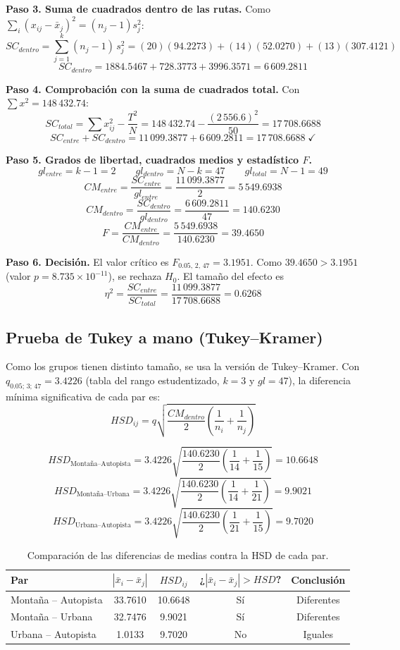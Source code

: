 \documentclass[12pt,letterpaper]{article}
\newcommand{\paren}[1]{\left(#1\right)}
\begin{document}
\textbf{Paso 3. Suma de cuadrados dentro de las rutas.} Como $\sum_i (x_{ij} - \bar{x}_j)^2 = (n_j - 1)s_j^2$:
$$ SC_{dentro} = \sum_{j=1}^{k} (n_j - 1)\,s_j^2 = (20)(94.2273) + (14)(52.0270) + (13)(307.4121) $$
$$ SC_{dentro} = 1884.5467 + 728.3773 + 3996.3571 = 6\,609.2811 $$

\textbf{Paso 4. Comprobación con la suma de cuadrados total.} Con $\sum x^2 = 148\,432.74$:
$$ SC_{total} = \sum x_{ij}^2 - \frac{T^2}{N} = 148\,432.74 - \frac{(2\,556.6)^2}{50} = 17\,708.6688 $$
$$ SC_{entre} + SC_{dentro} = 11\,099.3877 + 6\,609.2811 = 17\,708.6688 \;\checkmark $$

\textbf{Paso 5. Grados de libertad, cuadrados medios y estadístico $F$.}
$$ gl_{entre} = k - 1 = 2 \qquad gl_{dentro} = N - k = 47 \qquad gl_{total} = N - 1 = 49 $$
$$ CM_{entre} = \frac{SC_{entre}}{gl_{entre}} = \frac{11\,099.3877}{2} = 5\,549.6938 $$
$$ CM_{dentro} = \frac{SC_{dentro}}{gl_{dentro}} = \frac{6\,609.2811}{47} = 140.6230 $$
$$ F = \frac{CM_{entre}}{CM_{dentro}} = \frac{5\,549.6938}{140.6230} = 39.4650 $$

\textbf{Paso 6. Decisión.} El valor crítico es $F_{0.05,\,2,\,47} = 3.1951$. Como $39.4650 > 3.1951$ (valor $p = 8.735 \times 10^{-11}$), se rechaza $H_0$. El tamaño del efecto es
$$ \eta^2 = \frac{SC_{entre}}{SC_{total}} = \frac{11\,099.3877}{17\,708.6688} = 0.6268 $$


\subsection{Prueba de Tukey a mano (Tukey--Kramer)}

Como los grupos tienen distinto tamaño, se usa la versión de Tukey--Kramer. Con $q_{0.05;\,3;\,47} = 3.4226$ (tabla del rango estudentizado, $k = 3$ y $gl = 47$), la diferencia mínima significativa de cada par es:
$$ HSD_{ij} = q \sqrt{\frac{CM_{dentro}}{2}\paren{\frac{1}{n_i} + \frac{1}{n_j}}} $$

$$ HSD_{\text{Montaña--Autopista}} = 3.4226\sqrt{\frac{140.6230}{2}\paren{\frac{1}{14} + \frac{1}{15}}} = 10.6648 $$
$$ HSD_{\text{Montaña--Urbana}} = 3.4226\sqrt{\frac{140.6230}{2}\paren{\frac{1}{14} + \frac{1}{21}}} = 9.9021 $$
$$ HSD_{\text{Urbana--Autopista}} = 3.4226\sqrt{\frac{140.6230}{2}\paren{\frac{1}{21} + \frac{1}{15}}} = 9.7020 $$

\begin{table}[H]
\centering
\caption{Comparación de las diferencias de medias contra la HSD de cada par.}
\begin{tabular}{lcccc}
\toprule
Par & $|\bar{x}_i - \bar{x}_j|$ & $HSD_{ij}$ & ¿$|\bar{x}_i - \bar{x}_j| > HSD$? & Conclusión \\
\midrule
Montaña -- Autopista & 33.7610 & 10.6648 & Sí & Diferentes \\
Montaña -- Urbana & 32.7476 & 9.9021 & Sí & Diferentes \\
Urbana -- Autopista & 1.0133 & 9.7020 & No & Iguales \\
\bottomrule
\end{tabular}
\end{table}
\end{document}
